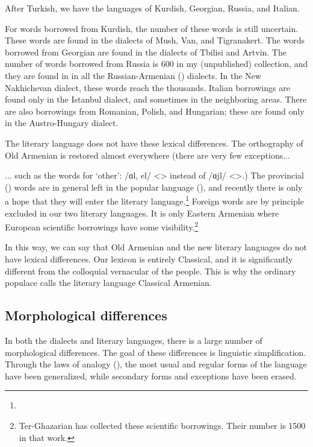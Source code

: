 After Turkish, we have the languages of Kurdish, Georgian, Russia, and Italian. 

For words borrowed from Kurdish, the number of these words is still uncertain. These words are found in the dialects of Mush, Van, and Tigranakert. The words borrowed from Georgian are found in the dialects of Tbilisi and Artvin. The number of words borrowed from Russia is 600 in my (unpublished) collection, and they are found in in all the Russian-Armenian () dialects. In the New Nakhichevan dialect, these words reach the thousands. Italian borrowings are found only in the Istanbul dialect, and sometimes in the neighboring areas. There are also borrowings from Romanian, Polish, and Hungarian; these are found only in the Austro-Hungary dialect. 

The literary language does not have these lexical differences. The orthography of Old Armenian is restored almost everywhere (there are very few exceptions... 



\begin{adjarianpage}\label{page:20}\end{adjarianpage}%

... such as the words for `other': /ɑl, el/ <> instead of /ɑjl/ <>.) The provincial () words are in general left in the popular language (), and recently there is only a hope that they will enter the literary language.\footnote{} Foreign words are by principle excluded in our two literary languages. It is only Eastern Armenian where European scientific borrowings have some visibility.\footnote{Ter-Ghazarian \citep{DerGhazarian-DictionaryBorrowed} has collected these scientific borrowings. Their number is 1500 in that work.}

In this way, we can say that Old Armenian and the new literary languages do not have lexical differences. Our lexicon is entirely Classical, and it is significantly different from the   colloquial vernacular of the people. This is why the ordinary populace calls the literary language Classical Armenian. 


\subsection{Morphological differences}
In both the dialects and literary languages, there is a large number of morphological differences. The goal of these differences is linguistic simplification. Through the laws of analogy (), the most usual and regular forms of the language have been generalized, while secondary forms and exceptions have been erased.


